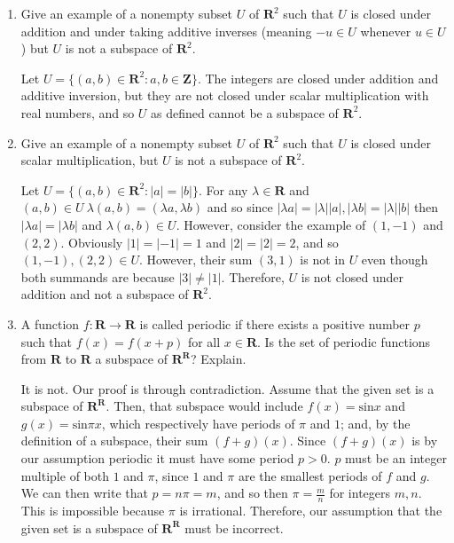 \documentclass{book}
\begin{document}
\begin{enumerate}
\item Give an example of a nonempty subset \(U\) of \(\textbf{R}^2\) such that \(U\) is closed under addition and under taking additive inverses (meaning \(-u \in U\) whenever \(u \in U\)) but \(U\) is not a subspace of \(\textbf{R}^2\).

Let \(U=\{(a,b) \in \textbf{R}^2: a,b \in \textbf{Z}\}\).  The integers are closed under addition and additive inversion, but they are not closed under scalar multiplication with real numbers, and so \(U\) as defined cannot be a subspace of \(\textbf{R}^2\).

\item Give an example of a nonempty subset \(U\) of \(\textbf{R}^2\) such that \(U\) is closed under scalar multiplication, but \(U\) is not a subspace of \(\textbf{R}^2\).

Let \(U=\{(a,b) \in \textbf{R}^2: |a|=|b|\}\).  For any \(\lambda \in \textbf{R}\) and \((a,b) \in U \ \lambda(a,b)=(\lambda{a},\lambda{b})\) and so since \(|\lambda{a}|=|\lambda||a|,|\lambda{b}|=|\lambda||b|\) then \(|\lambda{a}|=|\lambda{b}|\) and \(\lambda(a,b) \in U\).  However, consider the example of \((1,-1)\) and \((2,2)\).  Obviously \(|1|=|-1|=1\) and \(|2|=|2|=2\), and so \((1,-1),(2,2) \in U\).  However, their sum \((3,1)\) is not in \(U\) even though both summands are because \(|3| \neq |1|\).  Therefore, \(U\) is not closed under addition and not a subspace of \(\textbf{R}^2\).

\item A function \(f: \textbf{R} \rightarrow \textbf{R}\) is called periodic if there exists a positive number \(p\) such that \(f(x)=f(x+p)\) for all \(x \in \textbf{R}\).  Is the set of periodic functions from \(\textbf{R}\) to \(\textbf{R}\) a subspace of \(\textbf{R}^{\textbf{R}}\)? Explain.

It is not.  Our proof is through contradiction.  Assume that the given set is a subspace of \(\textbf{R}^{\textbf{R}}\).  Then, that subspace would include \(f(x)=\textrm{sin}x\) and \(g(x)=\textrm{sin}\pi{x}\), which respectively have periods of \(\pi\) and \(1\); and, by the definition of a subspace, their sum \((f+g)(x)\).  Since \((f+g)(x)\) is by our assumption periodic it must have some period \(p>0\).  \(p\) must be an integer multiple of both \(1\) and \(\pi\), since \(1\) and \(\pi\) are the smallest periods of \(f\) and \(g\).  We can then write that \(p=n\pi=m\), and so then \(\pi=\frac{m}{n}\) for integers \(m,n\).  This is impossible because \(\pi\) is irrational.  Therefore, our assumption that the given set is a subspace of \(\textbf{R}^{\textbf{R}}\) must be incorrect.


\end{enumerate}
\end{document}
